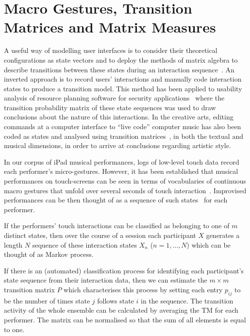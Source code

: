\documentclass{sigchi}
\begin{document}
\section{Macro Gestures, Transition Matrices and Matrix Measures}

A useful way of modelling user interfaces is to consider their
theoretical configurations as state vectors and to deploy the methods
of matrix algebra to describe transitions between these states during
an interaction sequence~\cite{Thimbleby:2001kq, Thimbleby:2004fj}. An
inverted approach is to record users' interactions and manually code
interaction states to produce a transition model. This method has been
applied to usability analysis of resource planning software for
security applications~\cite{Kannampallil:2007fp} where the transition
probability matrix of these state sequences was used to draw
conclusions about the nature of this interactions. In the creative
arts, editing commands at a computer interface to ``live code''
computer music has also been coded as states and analysed using
transition matrices~\cite{Swift:2014tya}, in both the textual and
musical dimensions, in order to arrive at conclusions regarding
artistic style.

In our corpus of iPad musical performances, logs of low-level touch
data record each performer's micro-gestures. However, it has been
established that musical performances on touch-screens can be seen in
terms of vocabularies of continuous macro gestures that unfold over
several seconds of touch interaction~\cite{Martin:2014cr}. Improvised
performances can be then thought of as a sequence of such
states~\cite{Pressing:1988uo} for each performer.

If the performers' touch interactions can be classified as belonging
to one of $m$ distinct states, then over the course of a session each
participant $X$ generates a length $N$ sequence of these interaction
states $X_n$ ($n = 1, \ldots, N$) which can be thought of as Markov
process.

If there is an (automated) classification process for identifying each
participant's state sequence from their interaction data, then we can
estimate the $m \times m$ transition matrix $P$ which characterises
this process by setting each entry $p_{ij}$ to be the number of times
state $j$ follows state $i$ in the sequence. The transition activity
of the whole ensemble can be calculated by averaging the TM for each
performer. The matrix can be normalised so that the sum of all
elements is equal to one.
\end{document}
